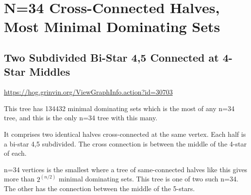 \documentclass{article}
\begin{document}
\begin{center}
\begin{tikzpicture}
\end{tikzpicture}
\end{center}


\clearpage
\section{N=34 Cross-Connected Halves, Most Minimal Dominating Sets}

\subsection{Two Subdivided Bi-Star 4,5 Connected at 4-Star Middles}

\url{https://hog.grinvin.org/ViewGraphInfo.action?id=30703}

\smallskip

This tree has 134432 minimal dominating sets which is the most of any
n=34 tree, and this is the only n=34 tree with this many.

It comprises two identical halves cross-connected at the same vertex.
Each half is a bi-star 4,5 subdivided.  The cross connection is
between the middle of the 4-star of each.

n=34 vertices is the smallest where a tree of same-connected halves
like this gives more than $2^(n/2)$ minimal dominating sets.  This tree
is one of two such n=34.  The other has the connection between the
middle of the 5-stars.
\end{document}
